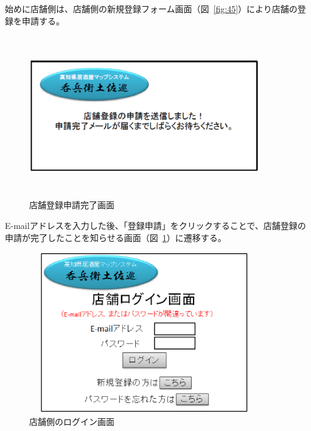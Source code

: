 \documentclass[a4j,titlepage]{jarticle}
\begin{document}
始めに店舗側は、店舗側の新規登録フォーム画面（図~\ref{fig:45}）により店舗の登録を申請する。



\begin {figure}[!htbp]
    \begin{center}
    \includegraphics [height=7cm, width=10cm]{46.eps}
    \caption {店舗登録申請完了画面}
    \label {fig:46}
    \end{center}
\end {figure}



E-mailアドレスを入力した後、「登録申請」をクリックすることで、店舗登録の申請が完了したことを知らせる画面（図~\ref{fig:46}）に遷移する。


\clearpage

\begin {figure}[!htbp]
    \begin{center}
    \includegraphics [height=7cm, width=10cm]{47.eps}
    \caption {店舗側のログイン画面}
    \label {fig:47}
    \end{center}
\end {figure}
\end{document}
